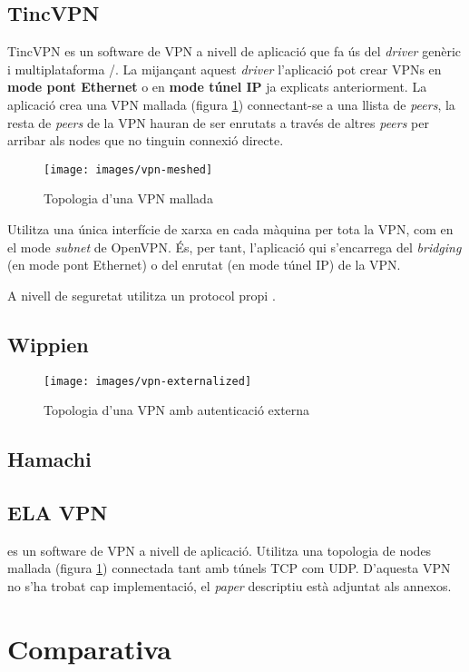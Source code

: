 \subsection{TincVPN}
TincVPN es un software de VPN a nivell de aplicació que fa ús del \emph{driver} genèric i multiplataforma /. La mijançant aquest \emph{driver} l'aplicació pot crear VPNs en \textbf{mode pont Ethernet} o en \textbf{mode túnel IP} ja explicats anteriorment. La aplicació crea una VPN mallada (figura \ref{F:vpn-meshed}) connectant-se a una llista de \emph{peers}, la resta de \emph{peers} de la VPN hauran de ser enrutats a través de altres \emph{peers} per arribar als nodes que no tinguin connexió directe.
\begin{figure}[htb]
\centering
\texttt{[image: images/vpn-meshed]}
\caption{Topologia d'una VPN mallada}
\label{F:vpn-meshed}
\end{figure}

Utilitza una única interfície de xarxa en cada màquina per tota la VPN, com en el mode \emph{subnet} de OpenVPN. És, per tant, l'aplicació qui s'encarrega del \emph{bridging} (en mode pont Ethernet) o del enrutat (en mode túnel IP) de la VPN.

A nivell de seguretat utilitza un protocol propi .

\subsection{Wippien}
\begin{figure}[htb]
\centering
\texttt{[image: images/vpn-externalized]}
\caption{Topologia d'una VPN amb autenticació externa}
\label{F:vpn-externalized}
\end{figure}

\subsection{Hamachi}

\subsection{ELA VPN}
 es un software de VPN a nivell de aplicació.
Utilitza una topologia de nodes mallada (figura \ref{F:vpn-meshed}) connectada tant amb túnels TCP com UDP.
D'aquesta VPN no s'ha trobat cap implementació, el \emph{paper} descriptiu està adjuntat als annexos.
\section{Comparativa}
